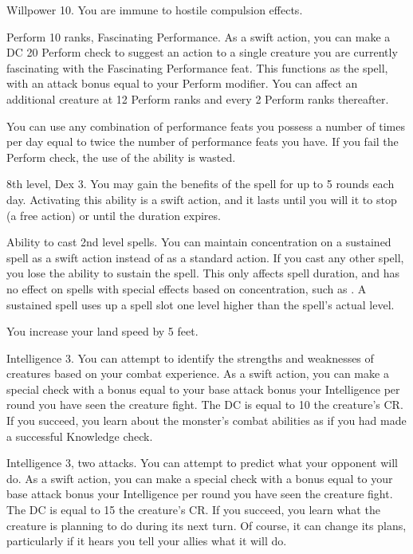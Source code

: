 \featpre Willpower 10.
\featben You are immune to hostile compulsion effects.

\featpre Perform 10 ranks, Fascinating Performance.
\featben As a swift action, you can make a DC 20 Perform check to suggest an action to a single creature you are currently fascinating with the Fascinating Performance feat.
This functions as the 
spell, with an attack bonus equal to your Perform modifier.
You can affect an additional creature at 12 Perform ranks and every 2 Perform ranks thereafter.

You can use any combination of performance feats you possess a number of times per day equal to twice the number of performance feats you have.
If you fail the Perform check, the use of the ability is wasted.

\featpre 8th level, Dex 3.
\featben You may gain the benefits of the 
spell for up to 5 rounds each day.
Activating this ability is a swift action, and it lasts until you will it to stop (a free action) or until the duration expires.

\featpre Ability to cast 2nd level spells.
\featben You can maintain concentration on a sustained spell as a swift action instead of as a standard action.
If you cast any other spell, you lose the ability to sustain the spell.
This only affects spell duration, and has no effect on spells with special effects based on concentration, such as .
A sustained spell uses up a spell slot one level higher than the spell's actual level.

\featben You increase your land speed by 5 feet.

\featpre Intelligence 3.
\featben You can attempt to identify the strengths and weaknesses of creatures based on your combat experience.
As a swift action, you can make a special check with a bonus equal to your base attack bonus \add your Intelligence  per round you have seen the creature fight.
The DC is equal to 10 \add the creature's CR.
If you succeed, you learn about the monster's combat abilities as if you had made a successful Knowledge check.

\featpres
Intelligence 3, two attacks.
\featben You can attempt to predict what your opponent will do.
As a swift action, you can make a special check with a bonus equal to your base attack bonus \add your Intelligence  per round you have seen the creature fight.
The DC is equal to 15 \add the creature's CR.
If you succeed, you learn what the creature is planning to do during its next turn.
Of course, it can change its plans, particularly if it hears you tell your allies what it will do.


